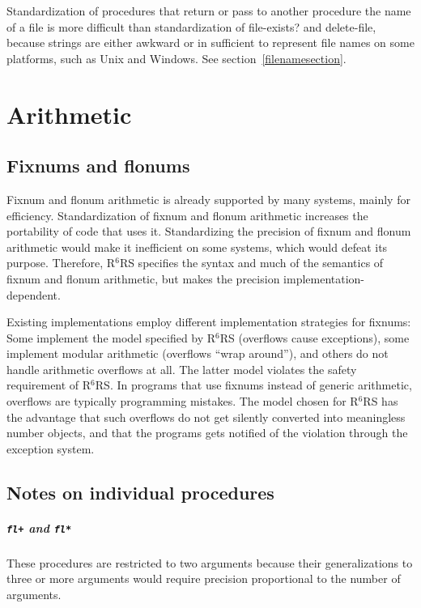 \documentclass[twoside,twocolumn]{algol60}
\newcommand{\rn}[1]{R$^{#1}$RS}
\begin{document}
Standardization of procedures that return or pass to another procedure
the name of a file is more difficult than standardization of {\cf
  file-exists?} and {\cf delete-file}, because strings are either
awkward or in sufficient to represent file names on some platforms,
such as Unix and Windows.  See section~\ref{filenamesection}.

\chapter{Arithmetic}

\section{Fixnums and flonums}

Fixnum and flonum arithmetic is already supported by many systems,
mainly for efficiency. Standardization of fixnum and flonum arithmetic
increases the portability of code that uses it.  Standardizing the
precision of fixnum and flonum arithmetic would make it inefficient on
some systems, which would defeat its purpose.  Therefore, \rn{6}
specifies the syntax and much of the semantics of fixnum and flonum
arithmetic, but makes the precision implementation-dependent.

Existing implementations employ different implementation strategies
for fixnums: Some implement the model specified by \rn{6} (overflows
cause exceptions), some implement modular arithmetic (overflows ``wrap
around''), and others do not handle arithmetic overflows at all.  The
latter model violates the safety requirement of \rn{6}.  In programs
that use fixnums instead of generic arithmetic, overflows are
typically programming mistakes.  The model chosen for \rn{6} has the
advantage that such overflows do not get silently converted into
meaningless number objects, and that the programs gets notified of the
violation through the exception system.

\section{Notes on individual procedures}

\paragraph{{\tt fl+} and {\tt fl*}}

These procedures are restricted to two arguments because their
generalizations to three or more arguments would require
precision proportional to the number of arguments.
\end{document}

